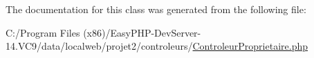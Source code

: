 The documentation for this class was generated from the following file\+:\begin{DoxyCompactItemize}
\item 
C\+:/\+Program Files (x86)/\+Easy\+P\+H\+P-\/\+Dev\+Server-\/14.\+V\+C9/data/localweb/projet2/controleurs/\hyperlink{_controleur_proprietaire_8php}{Controleur\+Proprietaire.\+php}\end{DoxyCompactItemize}
